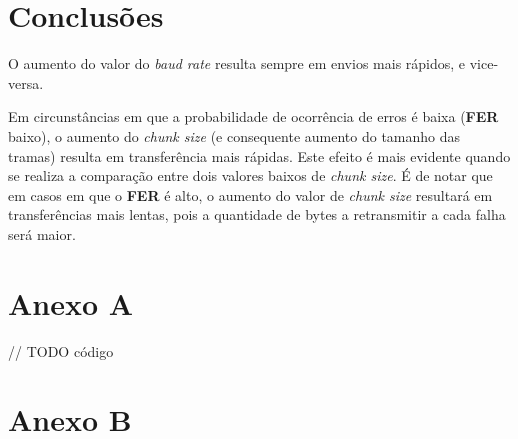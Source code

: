 \documentclass[11pt]{report}
\begin{document}
\chapter{Conclusões}

O aumento do valor do \textit{baud rate} resulta sempre em envios mais rápidos,
e vice-versa.

Em circunstâncias em que a probabilidade de ocorrência de erros é baixa
(\textbf{FER} baixo), o aumento do \textit{chunk size} (e consequente aumento
do tamanho das tramas) resulta em transferência mais rápidas. Este efeito é
mais evidente quando se realiza a comparação entre dois valores baixos de
\textit{chunk size}. É de notar que em casos em que o \textbf{FER} é alto,
o aumento do valor de \textit{chunk size} resultará em transferências mais
lentas, pois a quantidade de bytes a retransmitir a cada falha será maior.

\chapter*{Anexo A}

// TODO código

\chapter*{Anexo B}
\end{document}
